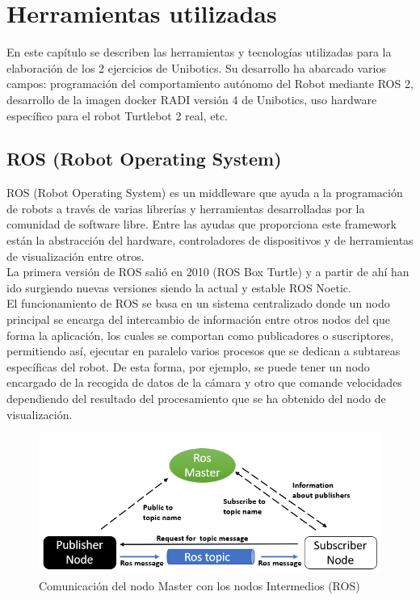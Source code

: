 \chapter{Herramientas utilizadas}
\label{cap:capitulo3}

En este capítulo se describen las herramientas y tecnologías utilizadas para la elaboración de los 2 ejercicios de Unibotics. Su desarrollo ha abarcado varios campos: programación del comportamiento autónomo del Robot mediante ROS 2, desarrollo de la imagen docker RADI versión 4 de Unibotics, uso hardware específico para el robot Turtlebot 2 real, etc.\\

\section{ROS (Robot Operating System)}
\label{sec:ros}
ROS (Robot Operating System) es un middleware que ayuda a la programación de robots a través de varias librerías y herramientas desarrolladas por la comunidad de software libre. Entre las ayudas que proporciona este framework están la abstracción del hardware, controladores de dispositivos y de herramientas de visualización entre otros.\\

La primera versión de ROS salió en 2010 (ROS Box Turtle) y a partir de ahí han ido surgiendo nuevas versiones siendo la actual y estable ROS Noetic.\\

El funcionamiento de ROS se basa en un sistema centralizado donde un nodo principal se encarga del intercambio de información entre otros nodos del que forma la aplicación, los cuales se comportan como publicadores o suscriptores, permitiendo así, ejecutar en paralelo varios procesos que se dedican a subtareas específicas del robot. De esta forma, por ejemplo, se puede tener un nodo encargado de la recogida de datos de la cámara y otro que comande velocidades dependiendo del resultado del procesamiento que se ha obtenido del nodo de visualización.\\

\begin{figure} [h!]
  \begin{center}
    \includegraphics[width=15cm]{imagenes/ros_master_communication.png}
  \end{center}
  \caption{Comunicación del nodo Master con los nodos Intermedios (ROS)}
  \label{fig:ros_master_comunicación}
\end{figure}\

